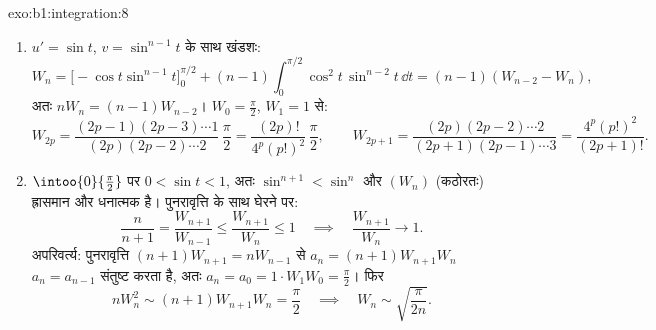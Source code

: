 \begin{solution}{exo:b1:integration:8}
\begin{enumerate}
  \item $u' = \sin t$, $v = \sin^{n-1} t$ के साथ खंडशः:
        \[
        W_n = \bigl[-\cos t\sin^{n-1}t\bigr]_0^{\pi/2}
        + (n-1)\int_0^{\pi/2} \cos^2 t\,\sin^{n-2} t\,\dd t
        = (n-1)(W_{n-2} - W_n),
        \]
        अतः $nW_n = (n-1)W_{n-2}$। $W_0 = \frac\pi2$, $W_1 = 1$ से:
        \[
        W_{2p} = \frac{(2p-1)(2p-3)\cdots 1}{(2p)(2p-2)\cdots 2}\,
        \frac{\pi}{2} = \frac{(2p)!}{4^p (p!)^2}\,\frac\pi2,
        \qquad
        W_{2p+1} = \frac{(2p)(2p-2)\cdots 2}{(2p+1)(2p-1)\cdots 3}
        = \frac{4^p (p!)^2}{(2p+1)!} .
        \]
  \item $\intoo{0}{\frac\pi2}$ पर $0 < \sin t < 1$, अतः $\sin^{n+1} <
  \sin^n$ और $(W_n)$ (कठोरतः) ह्रासमान और धनात्मक है। पुनरावृत्ति के साथ
  घेरने पर:
        \[
        \frac{n}{n+1} = \frac{W_{n+1}}{W_{n-1}}
        \leq \frac{W_{n+1}}{W_n} \leq 1
        \quad\implies\quad \frac{W_{n+1}}{W_n} \to 1 .
        \]
        अपरिवर्त्य: पुनरावृत्ति $(n+1)W_{n+1} = nW_{n-1}$ से $a_n =
        (n+1)W_{n+1}W_n$ $a_n = a_{n-1}$ संतुष्ट करता है, अतः $a_n = a_0 = 1
        \cdot W_1 W_0 = \frac\pi2$। फिर
        \[
        n W_n^2 \sim (n+1) W_{n+1} W_n = \frac\pi2
        \quad\implies\quad
        W_n \sim \sqrt{\frac{\pi}{2n}} .
        \]
\end{enumerate}
\end{solution}

